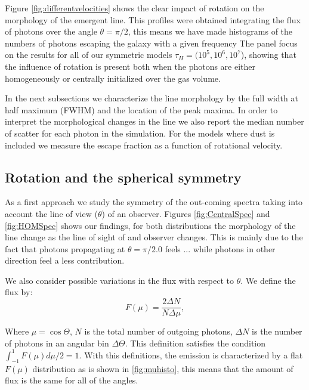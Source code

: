 \documentclass{emulateapj}
\newcommand{\ly}{{\ifmmode{{\rm Ly}\alpha~}\else{Ly$\alpha$~}\fi}}
\begin{document}
Figure \ref{fig:differentvelocities} shows the clear
impact of rotation on the morphology of the emergent \ly line.
This profiles were obtained integrating the flux of photons 
 over the angle $\theta = \pi/2$, this means we have made histograms of the 
 numbers of photons escaping the galaxy with a given frequency
The panel focus on the results for all of our symmetric models
 $\tau_{H}=(10^{5}, 10^{6}, 10^{7}$), showing that the
influence of rotation is present both when the photons are either
homogeneously or centrally initialized over the gas volume.  

In the next subsections we characterize the line morphology by the
full width at half maximum (FWHM) and the location of the peak
maxima. In order to interpret the morphological changes in the line we
also report the median number of scatter for each \ly photon in the
simulation. For the models where dust is included we measure the 
escape fraction as a function of rotational velocity. 

\subsection{Rotation and the spherical symmetry}

As a first approach we study the symmetry of the out-coming spectra
taking into account the line of view ($\theta$) of an observer. Figures 
\ref{fig:CentralSpec} and \ref{fig:HOMSpec} shows our findings, for 
both distributions the morphology of the line change as the line 
of sight of and observer changes. This is mainly due to the fact
that photons propagating at $\theta = \pi/2.0$ feels ... while photons in other direction feel
a less contribution.

We also consider possible variations in the flux with respect to $\theta$.
 We define the flux by:
\begin{equation}
F(\mu) = \frac{2\Delta N}{N\Delta \mu}, 
\end{equation} 

Where $\mu=\cos\Theta$, $N$ is the total number of outgoing photons,
$\Delta N$ is the number of photons in an angular bin $\Delta
\Theta$. This definition satisfies the condition
$\int_{-1}^{1}F(\mu)d\mu/2=1$.  With this definitions, the 
emission is characterized by a flat $F(\mu)$ distribution as 
is shown in \ref{fig:muhisto}, this means that the amount of flux
is the same for all of the angles. 
\end{document}

